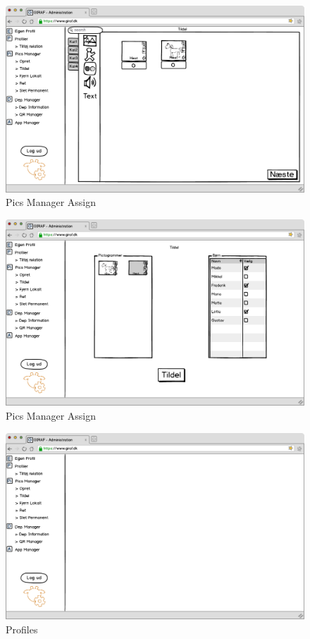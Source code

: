 \begin{figure}[p]
\centering
\includegraphics[width=14cm]{images/mockup/picsManagerTildel.png}
\caption{Pics Manager Assign}
\label{fig:pics_manager_assign}
\end{figure}

\newpage

\begin{figure}[p]
\centering
\includegraphics[width=14cm]{images/mockup/picsManagerTildel2.png}
\caption{Pics Manager Assign}
\label{fig:pics_manager_assign2}
\end{figure}

\begin{figure}[p]
\centering
\includegraphics[width=14cm]{images/mockup/profiler.png}
\caption{Profiles}
\label{fig:profiles}
\end{figure}

